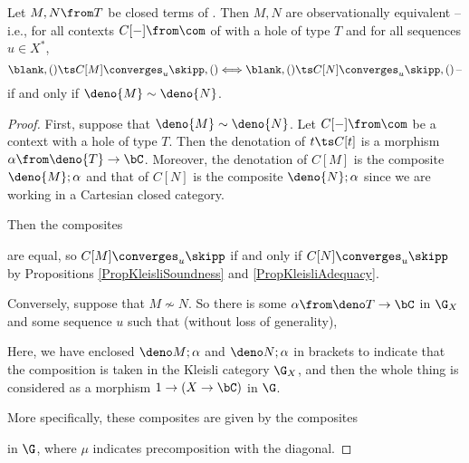 \begin{theorem}
  Let $M,N\from T$ be closed terms of \IAX.  
  Then $M,N$ are observationally equivalent -- i.e., for all contexts $C[-]\from\com$ of \IAX with a hole of type $T$ and for all sequences $u\in X^*$, 
  \[
    \blank,()\ts C[M] \converges_u \skipp,() \Longleftrightarrow \blank,()\ts C[N] \converges_u \skipp,()\,\text{--}
    \]
  if and only if $\deno{M}\sim\deno{N}$.
  \label{TheKleisliFullAbstraction}
\end{theorem}
\begin{proof}
  First, suppose that $\deno{M}\sim\deno{N}$.  
  Let $C[-]\from\com$ be a context with a hole of type $T$.  
  Then the denotation of $t\ts C[t]$ is a morphism $\alpha\from \deno{T} \to \bC$.
  Moreover, the denotation of $C[M]$ is the composite $\deno{M};\alpha$ and that of $C[N]$ is the composite $\deno{N};\alpha$ since we are working in a Cartesian closed category.

  Then the composites
  are equal, so $C[M]\converges_u\skipp$ if and only if $C[N]\converges_u\skipp$ by Propositions \ref{PropKleisliSoundness} and \ref{PropKleisliAdequacy}.

  Conversely, suppose that $M\not\sim N$.  
  So there is some $\alpha\from \deno T \to \bC$ in $\G_X$ and some sequence $u$ such that (without loss of generality),
  Here, we have enclosed $\deno M;\alpha$ and $\deno N;\alpha$ in brackets to indicate that the composition is taken in the Kleisli category $\G_X$, and then the whole thing is considered as a morphism $1 \to (X \to \bC)$ in $\G$.

  More specifically, these composites are given by the composites
  in $\G$, where $\mu$ indicates precomposition with the diagonal.


\end{proof}
